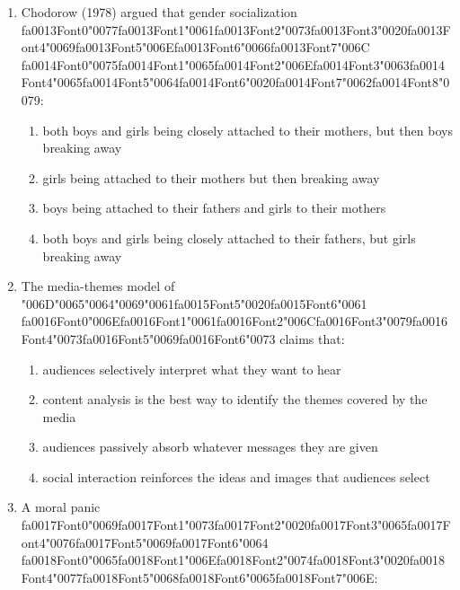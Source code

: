 \documentclass[12pt]{article}
\begin{document}
\begin{enumerate}[label=\arabic*.]
\item Chodorow (1978) argued that gender socialization {\csname fa0013Font0\endcsname\char"0077}{\csname fa0013Font1\endcsname\char"0061}{\csname fa0013Font2\endcsname\char"0073}{\csname fa0013Font3\endcsname\char"0020}{\csname fa0013Font4\endcsname\char"0069}{\csname fa0013Font5\endcsname\char"006E}{\csname fa0013Font6\endcsname\char"0066}{\csname fa0013Font7\endcsname\char"006C} {\csname fa0014Font0\endcsname\char"0075}{\csname fa0014Font1\endcsname\char"0065}{\csname fa0014Font2\endcsname\char"006E}{\csname fa0014Font3\endcsname\char"0063}{\csname fa0014Font4\endcsname\char"0065}{\csname fa0014Font5\endcsname\char"0064}{\csname fa0014Font6\endcsname\char"0020}{\csname fa0014Font7\endcsname\char"0062}{\csname fa0014Font8\endcsname\char"0079}:
\begin{enumerate}[label=(\alph*)]
    \item both boys and girls being closely attached to their mothers, but then boys breaking away
    \item girls being attached to their mothers but then breaking away
    \item boys being attached to their fathers and girls to their mothers
    \item both boys and girls being closely attached to their fathers, but girls breaking away
\end{enumerate}
\item The media-themes model of {\char"006D}{\char"0065}{\char"0064}{\char"0069}{\char"0061}{\csname fa0015Font5\endcsname\char"0020}{\csname fa0015Font6\endcsname\char"0061} {\csname fa0016Font0\endcsname\char"006E}{\csname fa0016Font1\endcsname\char"0061}{\csname fa0016Font2\endcsname\char"006C}{\csname fa0016Font3\endcsname\char"0079}{\csname fa0016Font4\endcsname\char"0073}{\csname fa0016Font5\endcsname\char"0069}{\csname fa0016Font6\endcsname\char"0073} claims that:
\begin{enumerate}[label=(\alph*)]
    \item audiences selectively interpret what they want to hear
    \item content analysis is the best way to identify the themes covered by the media
    \item audiences passively absorb whatever messages they are given
    \item social interaction reinforces the ideas and images that audiences select
\end{enumerate}
\item A moral panic {\csname fa0017Font0\endcsname\char"0069}{\csname fa0017Font1\endcsname\char"0073}{\csname fa0017Font2\endcsname\char"0020}{\csname fa0017Font3\endcsname\char"0065}{\csname fa0017Font4\endcsname\char"0076}{\csname fa0017Font5\endcsname\char"0069}{\csname fa0017Font6\endcsname\char"0064} {\csname fa0018Font0\endcsname\char"0065}{\csname fa0018Font1\endcsname\char"006E}{\csname fa0018Font2\endcsname\char"0074}{\csname fa0018Font3\endcsname\char"0020}{\csname fa0018Font4\endcsname\char"0077}{\csname fa0018Font5\endcsname\char"0068}{\csname fa0018Font6\endcsname\char"0065}{\csname fa0018Font7\endcsname\char"006E}:

\end{enumerate}
\end{document}
